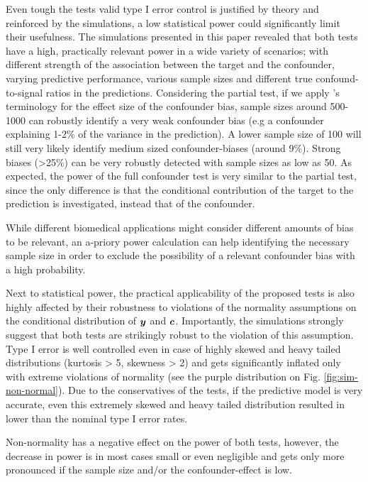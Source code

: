 \documentclass{article}
\begin{document}
Even tough the tests valid type I error control is justified by theory and reinforced by the simulations, a low statistical power could significantly limit their usefulness. The simulations presented in this paper revealed that both tests have a high, practically relevant power in a wide variety of scenarios; with different strength of the association between the target and the confounder, varying predictive performance, various sample sizes and different true confound-to-signal ratios in the predictions. Considering the partial test, if we apply \citeauthor{cohen2013statistical}'s terminology for the effect size of the confounder bias, sample sizes around 500-1000 can robustly identify a very weak confounder bias (e.g a confounder explaining 1-2\% of the variance in the prediction). A lower sample size of 100 will still very likely identify medium sized confounder-biases (around 9\%). Strong biases  (>25\%) can be very robustly detected with sample sizes as low as 50. 
As expected, the power of the full confounder test is very similar to the partial test, since the only difference is that the conditional contribution of the target to the prediction is investigated, instead that of the confounder.

While different biomedical applications might consider different amounts of bias to be relevant, an a-priory power calculation can help identifying the necessary sample size in order to exclude the possibility of a relevant confounder bias with a high probability.

Next to statistical power, the practical applicability of the proposed tests is also highly affected by their robustness to violations of the normality assumptions on the conditional distribution of $\boldsymbol{y}$ and $\boldsymbol{c}$. Importantly, the simulations strongly suggest that both tests are strikingly robust to the violation of this assumption. Type I error is well controlled even in case of highly skewed and heavy tailed distributions (kurtosis > 5, skewness > 2) and gets significantly inflated only with extreme violations of normality (see the purple distribution on Fig. \ref{fig:sim-non-normal}). Due to the conservatives of the tests, if the predictive model is very accurate, even this extremely skewed and heavy tailed distribution resulted in lower than the nominal type I error rates.

Non-normality has a negative effect on the power of both tests, however, the decrease in power is in most cases small or even negligible and gets only more pronounced if the sample size and/or the confounder-effect is low.
\end{document}
